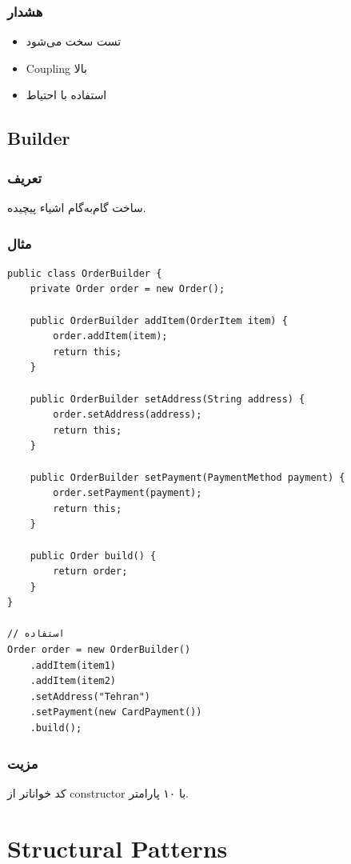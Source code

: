 \documentclass[12pt, a4paper]{article}
\begin{document}
\subsubsection{هشدار}
\begin{itemize}
    \item تست سخت می‌شود
    \item Coupling بالا
    \item استفاده با احتیاط
\end{itemize}

\subsection{Builder}

\subsubsection{تعریف}
ساخت گام‌به‌گام اشیاء پیچیده.

\subsubsection{مثال}
\begin{lstlisting}
public class OrderBuilder {
    private Order order = new Order();
    
    public OrderBuilder addItem(OrderItem item) {
        order.addItem(item);
        return this;
    }
    
    public OrderBuilder setAddress(String address) {
        order.setAddress(address);
        return this;
    }
    
    public OrderBuilder setPayment(PaymentMethod payment) {
        order.setPayment(payment);
        return this;
    }
    
    public Order build() {
        return order;
    }
}

// استفاده
Order order = new OrderBuilder()
    .addItem(item1)
    .addItem(item2)
    .setAddress("Tehran")
    .setPayment(new CardPayment())
    .build();
\end{lstlisting}

\subsubsection{مزیت}
کد خواناتر از constructor با ۱۰ پارامتر.

\section{Structural Patterns}
\end{document}

